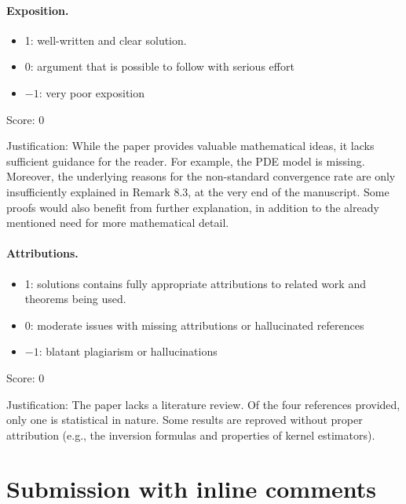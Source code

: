 \documentclass[11pt]{article}
\theoremstyle{remark}
\begin{document}
\paragraph{Exposition.}
\begin{itemize}
	\item  1: well-written and clear solution.
	\item  0: argument that is possible to follow with serious effort
	\item  $-1$: very poor exposition
\end{itemize}

\noindent Score: 0

\noindent Justification: While the paper provides valuable mathematical ideas, it lacks sufficient guidance for the reader. For example, the PDE model is missing. Moreover, the underlying reasons for the non-standard convergence rate are only insufficiently explained in Remark 8.3, at the very end of the manuscript. Some proofs would also benefit from further explanation, in addition to the already mentioned need for more mathematical detail.

\paragraph{Attributions.}
\begin{itemize}
	\item  1: solutions contains fully appropriate attributions
		to related work and theorems being used.
	\item  0: moderate issues with missing attributions or hallucinated references
	\item  $-1$: blatant plagiarism or hallucinations
\end{itemize}

\noindent Score: 0

\noindent Justification: The paper lacks a literature review. Of the four references provided, only one is statistical in nature. Some results are reproved without proper attribution (e.g., the inversion formulas and properties of kernel estimators).

\newpage
\section{Submission with inline comments}


\begin{abstract}
For a sufficiently small, fixed H\"older--Zygmund ball of conductivities
around the constant function \(1\), the minimax squared \(L^2\)-risk is,
up to logarithmic factors,
\[
n^{-2\alpha/(2\alpha+d+3)}.
\]
We prove matching polynomial upper and lower bounds for every \(d\geq2\)
and \(\alpha>1\). The upper bound uses a regularized reconstruction along
gradient trajectories, together with a variance estimate that exploits
integration along these trajectories. The lower bound uses perturbations
that oscillate in the \(d-1\) angular directions. No boundary condition
on the conductivity is imposed.
\end{abstract}
\end{document}
